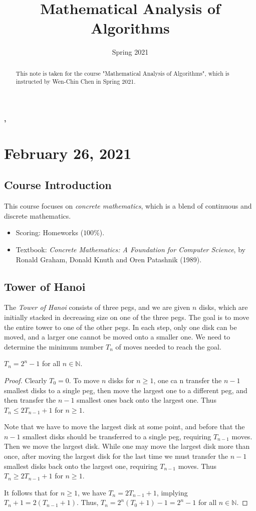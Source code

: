 \documentclass[11pt]{article}
\title{Mathematical Analysis of Algorithms}
\date{Spring 2021}
\newcommand{\NN}{\mathbb{N}}
\begin{document}
\begin{center}
  \LARGE \bfseries \thetitle, \thedate
\end{center}

\begin{abstract}
  This note is taken for the course "Mathematical Analysis of Algorithms", which is instructed by Wen-Chin Chen in Spring 2021.
\end{abstract}

\tableofcontents

\section{February 26, 2021}
\subsection{Course Introduction}
This course focuses on \emph{concrete mathematics}, which is a blend of continuous and discrete mathematics.

\begin{itemize}
  \item Scoring: Homeworks ($100\%$).
  \item Textbook: \textsl{Concrete Mathematics: A Foundation for Computer Science}, by Ronald Graham, Donald Knuth and Oren Patashnik (1989).
\end{itemize}

\subsection{Tower of Hanoi}
The \emph{Tower of Hanoi} consists of three pegs, and we are given $n$ disks, which are initially stacked in decreasing size on one of the three pegs.
The goal is to move the entire tower to one of the other pegs.
In each step, only one disk can be moved, and a larger one cannot be moved onto a smaller one.
We need to determine the minimum number $T_n$ of moves needed to reach the goal.

\begin{theorem}
  $T_n = 2^n - 1$ for all $n \in \NN$.
\end{theorem}
\begin{proof}
  Clearly $T_0 = 0$.
  To move $n$ disks for $n \geq 1$, one ca
  n transfer the $n - 1$ smallest disks to a single peg, then move the largest one to a different peg, and then transfer the $n - 1$ smallest ones back onto the largest one.
  Thus $T_n \leq 2T_{n-1} + 1$ for $n \geq 1$.
  \par Note that we have to move the largest disk at some point, and before that the $n-1$ smallest disks should be transferred to a single peg, requiring $T_{n-1}$ moves.
  Then we move the largest disk.
  While one may move the largest disk more than once, after moving the largest disk for the last time we must transfer the $n-1$ smallest disks back onto the largest one, requiring $T_{n-1}$ moves.
  Thus $T_n \geq 2T_{n-1} + 1$ for $n \geq 1$.
  \par It follows that for $n \geq 1$, we have $T_n = 2T_{n-1} + 1$, implying $T_n + 1 = 2(T_{n-1} + 1)$.
  Thus, $T_n = 2^n(T_0 + 1) - 1 = 2^n - 1$ for all $n \in \NN$.
\end{proof}
\end{document}
